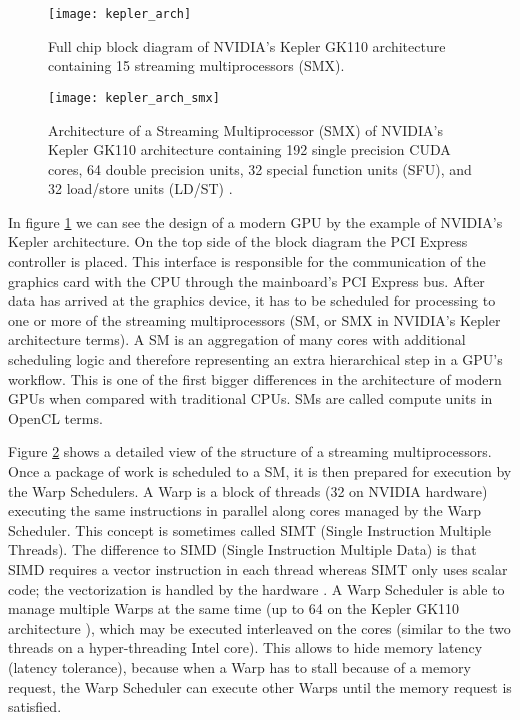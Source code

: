 \begin{figure}
\centering
\texttt{[image: kepler\_arch]}
\caption{Full chip block diagram of NVIDIA's Kepler GK110 architecture containing 15 streaming multiprocessors (SMX). \cite{kepler_arch}}
\label{fig:kepler_arch}
\end{figure}

\begin{figure}
\centering
\texttt{[image: kepler\_arch\_smx]}
\caption{Architecture of a Streaming Multiprocessor (SMX) of NVIDIA's Kepler GK110 architecture containing 192 single precision CUDA cores, 64 double precision units, 32 special function units (SFU), and 32 load/store units (LD/ST) \cite{kepler_arch}.}
\label{fig:kepler_arch_smx}
\end{figure}

In figure \ref{fig:kepler_arch} we can see the design of a modern GPU by the example of NVIDIA's Kepler architecture. On the top side of the block diagram the PCI Express controller is placed. This interface is responsible for the communication of the graphics card with the CPU through the mainboard's PCI Express bus. After data has arrived at the graphics device, it has to be scheduled for processing to one or more of the streaming multiprocessors (SM, or SMX in NVIDIA's Kepler architecture terms). A SM is an aggregation of many cores with additional scheduling logic and therefore representing an extra hierarchical step in a GPU's workflow. This is one of the first bigger differences in the architecture of modern GPUs when compared with traditional CPUs. SMs are called compute units in OpenCL terms.

Figure \ref{fig:kepler_arch_smx} shows a detailed view of the structure of a streaming multiprocessors. Once a package of work is scheduled to a SM, it is then prepared for execution by the Warp Schedulers. A Warp is a block of threads (32 on NVIDIA hardware) executing the same instructions in parallel along cores managed by the Warp Scheduler. This concept is sometimes called SIMT (Single Instruction Multiple Threads). The difference to SIMD (Single Instruction Multiple Data) is that SIMD requires a vector instruction in each thread whereas SIMT only uses scalar code; the vectorization is handled by the hardware \cite[p.99]{gpu_optimizations}. A Warp Scheduler is able to manage multiple Warps at the same time (up to 64 on the Kepler GK110 architecture \cite[p.7]{kepler_arch}), which may be executed interleaved on the cores (similar to the two threads on a hyper-threading Intel core). This allows to hide memory latency (latency tolerance), because when a Warp has to stall because of a memory request, the Warp Scheduler can execute other Warps until the memory request is satisfied.


